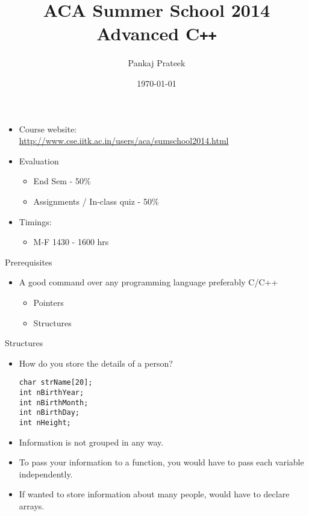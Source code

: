\documentclass{beamer}
\title{ACA Summer School 2014\\ Advanced C\texttt{++}}
\author{Pankaj Prateek}
\institute{ACA, CSE, IIT Kanpur}
\date{\today}
\begin{document}
\begin{frame}
  \titlepage
\end{frame}

\begin{frame}[fragile]{}
  \begin{itemize}
    \item Course website:\\
      \url{http://www.cse.iitk.ac.in/users/aca/sumschool2014.html}
    \item Evaluation
      \begin{itemize}
        \item End Sem - 50\%
        \item Assignments / In-class quiz - 50\%
      \end{itemize}
    \item Timings:
      \begin{itemize}
      \item M-F 1430 - 1600 hrs
      \end{itemize}
  \end{itemize}
\end{frame}

\begin{frame}[fragile]{Prerequisites}
  \begin{itemize}
    \item A good command over any programming language preferably C/C++
      \begin{itemize}
        \item Pointers
        \item Structures
      \end{itemize}
  \end{itemize}
\end{frame}

\begin{frame}[fragile]{Structures}
  \begin{itemize}
    \item How do you store the details of a person?\pause
      \begin{lstlisting}
char strName[20];
int nBirthYear;
int nBirthMonth;
int nBirthDay;
int nHeight;
      \end{lstlisting}\pause
    \item Information is not grouped in any way. \pause
    \item To pass your information to a function, you would have to pass each variable independently.\pause
    \item If wanted to store information about many people, would have to declare arrays.
  \end{itemize}
\end{frame}
\end{document}
